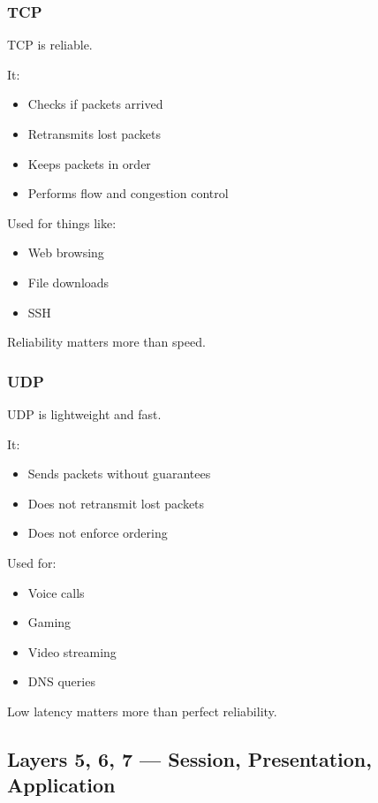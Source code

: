 \subsubsection*{TCP}

TCP is reliable.

It:
\begin{itemize}
    \item Checks if packets arrived
    \item Retransmits lost packets
    \item Keeps packets in order
    \item Performs flow and congestion control
\end{itemize}

Used for things like:
\begin{itemize}
    \item Web browsing
    \item File downloads
    \item SSH
\end{itemize}

Reliability matters more than speed.

\subsubsection*{UDP}

UDP is lightweight and fast.

It:
\begin{itemize}
    \item Sends packets without guarantees
    \item Does not retransmit lost packets
    \item Does not enforce ordering
\end{itemize}

Used for:
\begin{itemize}
    \item Voice calls
    \item Gaming
    \item Video streaming
    \item DNS queries
\end{itemize}

Low latency matters more than perfect reliability.

\subsection*{Layers 5, 6, 7 --- Session, Presentation, Application}

